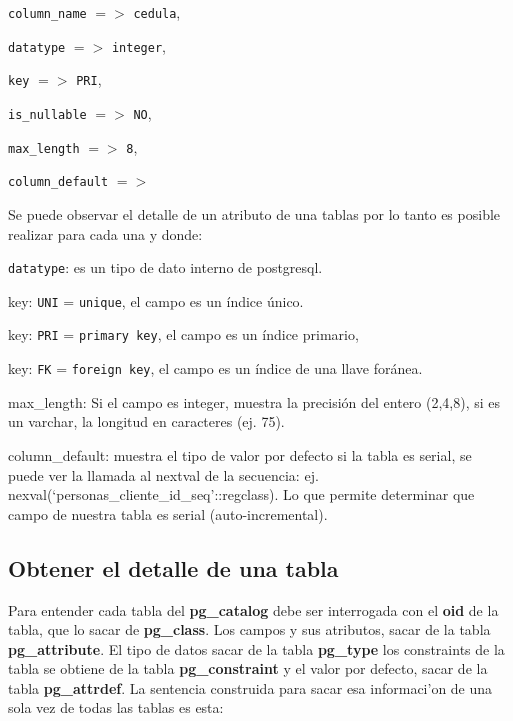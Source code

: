 \texttt{column\_name} $=>$ \texttt{cedula},
 
\texttt{datatype} $=>$ \texttt{integer}, 

\texttt{key} $=>$ \texttt{PRI},

\texttt{is\_nullable} $=>$ \texttt{NO},

\texttt{max\_length} $=>$ \texttt{8}, 

\texttt{column\_default} $=>$

Se puede observar el detalle de un atributo de una tablas por lo tanto es posible realizar para cada una y donde:

\texttt{datatype}: es un tipo de dato interno de postgresql.


key: \texttt{UNI} = \texttt{unique}, el campo es un \'indice \'unico.

 
key:	 \texttt{PRI} = \texttt{primary key}, el campo es un \'indice primario, 

key:	 \texttt{FK} = \texttt{foreign key}, el campo es un \'indice de una llave for\'anea.

max\_length: Si el campo es integer, muestra la precisi\'on del entero (2,4,8), si es un varchar, la longitud en caracteres (ej. 75).

column\_default: muestra el tipo de valor por defecto si la tabla es serial, se puede ver la llamada al nextval de la secuencia: ej. nexval(‘personas\_cliente\_id\_seq'::regclass). Lo que permite determinar que campo de nuestra tabla es serial (auto-incremental).

\subsection{Obtener el detalle de una tabla} 
Para entender cada tabla del \textbf{pg\_catalog} debe ser interrogada con el \textbf{oid} de la tabla, que lo sacar de \textbf{pg\_class}.
Los campos y sus atributos, sacar de la tabla \textbf{pg\_attribute}.
El tipo de datos sacar de la tabla \textbf{pg\_type}
los constraints de la tabla se obtiene de la tabla \textbf{pg\_constraint}
y el valor por defecto, sacar de la tabla \textbf{pg\_attrdef}.
La sentencia construida para sacar esa informaci'on de una sola vez de todas las tablas es esta:

